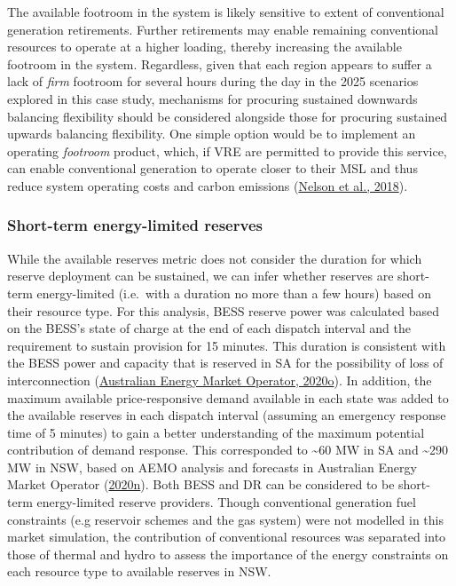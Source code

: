 \documentclass[12pt,a4paper,]{report}
\begin{document}
The available footroom in the system is likely sensitive to extent of
conventional generation retirements. Further retirements may enable
remaining conventional resources to operate at a higher loading, thereby
increasing the available footroom in the system. Regardless, given that
each region appears to suffer a lack of \emph{firm} footroom for several
hours during the day in the 2025 scenarios explored in this case study,
mechanisms for procuring sustained downwards balancing flexibility
should be considered alongside those for procuring sustained upwards
balancing flexibility. One simple option would be to implement an
operating \emph{footroom} product, which, if VRE are permitted to
provide this service, can enable conventional generation to operate
closer to their MSL and thus reduce system operating costs and carbon
emissions
(\protect\hyperlink{ref-nelsonInvestigatingEconomicValue2018}{Nelson et
al., 2018}).

\hypertarget{sec:reserves-stelr}{%
\subsubsection{Short-term energy-limited
reserves}\label{sec:reserves-stelr}}

While the available reserves metric does not consider the duration for
which reserve deployment can be sustained, we can infer whether reserves
are short-term energy-limited (i.e.~with a duration no more than a few
hours) based on their resource type. For this analysis, BESS reserve
power was calculated based on the BESS's state of charge at the end of
each dispatch interval and the requirement to sustain provision for 15
minutes. This duration is consistent with the BESS power and capacity
that is reserved in SA for the possibility of loss of interconnection
(\protect\hyperlink{ref-australianenergymarketoperator2020SystemStrength2020}{Australian
Energy Market Operator, 2020o}). In addition, the maximum available
price-responsive demand available in each state was added to the
available reserves in each dispatch interval (assuming an emergency
response time of 5 minutes) to gain a better understanding of the
maximum potential contribution of demand response. This corresponded to
\textasciitilde60 MW in SA and \textasciitilde290 MW in NSW, based on
AEMO analysis and forecasts in Australian Energy Market Operator
(\protect\hyperlink{ref-australianenergymarketoperator2020InputsAssumptions2020}{2020n}).
Both BESS and DR can be considered to be short-term energy-limited
reserve providers. Though conventional generation fuel constraints (e.g
reservoir schemes and the gas system) were not modelled in this market
simulation, the contribution of conventional resources was separated
into those of thermal and hydro to assess the importance of the energy
constraints on each resource type to available reserves in NSW.
\end{document}
